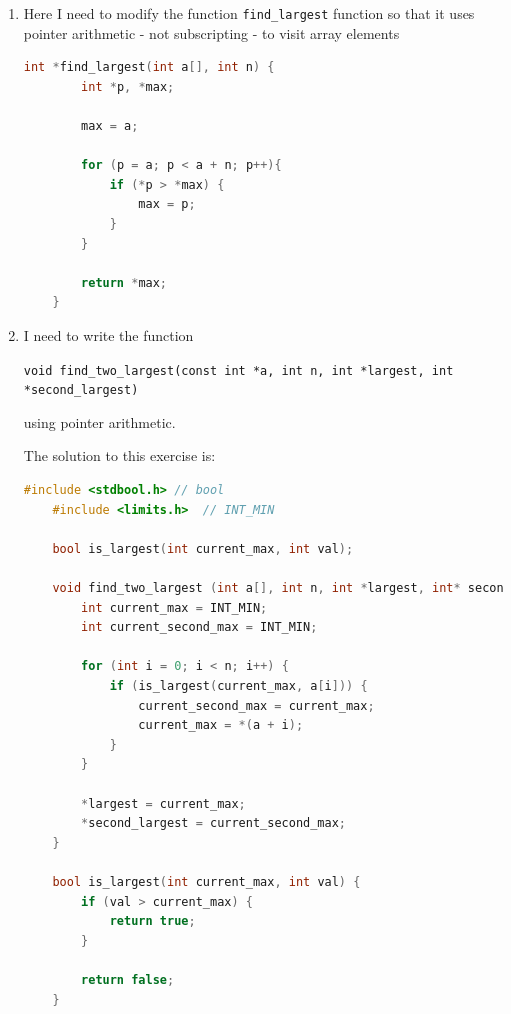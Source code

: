 \documentclass[12pt]{article}
\begin{document}
\begin{enumerate}[1.]
    \item

    Here I need to modify the function \texttt{find\_largest} function so that it
    uses pointer arithmetic - not subscripting - to visit array elements

    \bigskip

\begin{lstlisting}[language=c]
    int *find_largest(int a[], int n) {
        int *p, *max;

        max = a;

        for (p = a; p < a + n; p++){
            if (*p > *max) {
                max = p;
            }
        }

        return *max;
    }
\end{lstlisting}

    \item

    I need to write the function

    \bigskip

    \texttt{void find\_two\_largest(const int *a, int n, int *largest, int *second\_largest)}

    \bigskip

    using pointer arithmetic.

    \bigskip

    The solution to this exercise is:

    \bigskip


\begin{lstlisting}[language=c]
    #include <stdbool.h> // bool
    #include <limits.h>  // INT_MIN

    bool is_largest(int current_max, int val);

    void find_two_largest (int a[], int n, int *largest, int* second_largest) {
        int current_max = INT_MIN;
        int current_second_max = INT_MIN;

        for (int i = 0; i < n; i++) {
            if (is_largest(current_max, a[i])) {
                current_second_max = current_max;
                current_max = *(a + i);
            }
        }

        *largest = current_max;
        *second_largest = current_second_max;
    }

    bool is_largest(int current_max, int val) {
        if (val > current_max) {
            return true;
        }

        return false;
    }
\end{lstlisting}


\end{enumerate}
\end{document}
